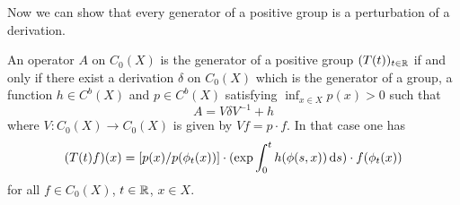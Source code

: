 Now we can show that every generator of a positive group is a perturbation of a derivation.
\begin{theorem}\label{thm:b2-3.14}
An operator $A$ on $C_{0}(X)$ is the generator of a positive group $(T(t))_{t \in \mathbb{R}}$ if and only if there exist a derivation $\delta$ on $C_{0}(X)$ which is the generator of a group, a function $h \in C^{b}(X)$ and $p \in C^{b}(X)$ satisfying $\inf_{x \in X} p(x) > 0$ such that
\begin{equation}\label{eq:b2-3.18}
A = V\delta V^{-1} + h
\end{equation}
where $V \colon C_{0}(X) \to C_{0}(X)$ is given by $Vf = p \cdot f$. In that case one has
\begin{equation}\label{eq:b2-3.19}
(T(t)f)(x) = [p(x)/p(\phi_{t}(x))] \cdot (\exp \int_{0}^{t} h(\phi(s,x)) \mathop{}\!\mathrm{d}{s}) \cdot f(\phi_{t}(x))
\end{equation}
for all $f \in C_{0}(X)$, $t \in \mathbb{R}$, $x \in X$.
\end{theorem}

